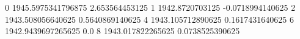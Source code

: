 0 1945.5975341796875 2.653564453125
1 1942.8720703125 -0.0718994140625
2 1943.508056640625 0.5640869140625
4 1943.105712890625 0.1617431640625
6 1942.9439697265625 0.0
8 1943.017822265625 0.0738525390625
